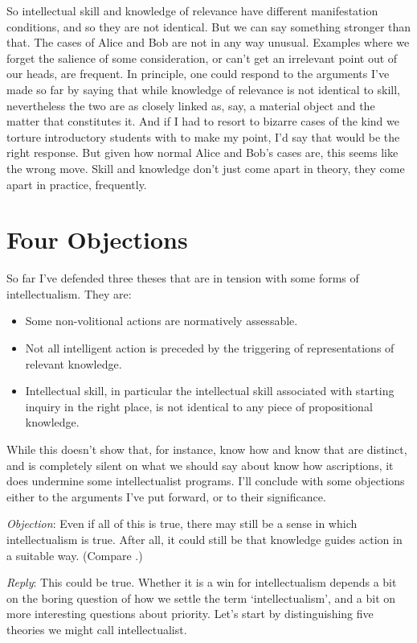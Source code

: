 So intellectual skill and knowledge of relevance have different manifestation conditions, and so they are not identical. But we can say something stronger than that. The cases of Alice and Bob are not in any way unusual. Examples where we forget the salience of some consideration, or can't get an irrelevant point out of our heads, are frequent. In principle, one could respond to the arguments I've made so far by saying that while knowledge of relevance is not identical to skill, nevertheless the two are as closely linked as, say, a material object and the matter that constitutes it. And if I had to resort to bizarre cases of the kind we torture introductory students with to make my point, I'd say that would be the right response. But given how normal Alice and Bob's cases are, this seems like the wrong move. Skill and knowledge don't just come apart in theory, they come apart in practice, frequently.


\section{Four Objections}
\label{fourobjections}

So far I've defended three theses that are in tension with some forms of intellectualism. They are:

\begin{itemize}
\item Some non-volitional actions are normatively assessable.
\item Not all intelligent action is preceded by the triggering of representations of relevant knowledge.
\item Intellectual skill, in particular the intellectual skill associated with starting inquiry in the right place, is not identical to any piece of propositional knowledge.
\end{itemize}
%
While this doesn't show that, for instance, know how and know that are distinct, and is completely silent on what we should say about know how ascriptions, it does undermine some intellectualist programs. I'll conclude with some objections either to the arguments I've put forward, or to their significance.

\emph{Objection}: Even if all of this is true, there may still be a sense in which intellectualism is true. After all, it could still be that knowledge guides action in a suitable way. (Compare \cite[p. 2]{Stanley2011}.)

\emph{Reply}: This could be true. Whether it is a win for intellectualism depends a bit on the boring question of how we settle the term `intellectualism', and a bit on more interesting questions about priority. Let's start by distinguishing five theories we might call intellectualist.

